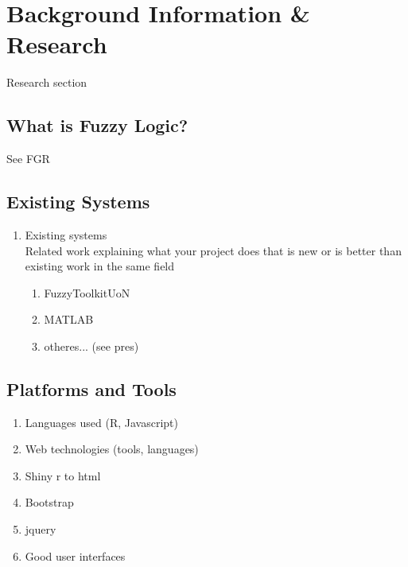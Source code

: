 \section{Background Information \& Research}

{\color{red}Research section}
\subsection{What is Fuzzy Logic?}
{\color{red}See FGR}

\subsection{Existing Systems}
\label{sec:existing-systems}

{\color{red}\begin{enumerate}
\item Existing systems\\
{\color{red} Related work explaining what your project does that is new or is better than existing work in the same field}
	\begin{enumerate}
		\item FuzzyToolkitUoN
		\item MATLAB
		\item otheres... (see pres)
	\end{enumerate}
\end{enumerate}
}

\subsection{Platforms and Tools}
{\color{red}\begin{enumerate}
\item Languages used (R, Javascript)
\item Web technologies (tools, languages)
\item Shiny r to html
\item Bootstrap
\item jquery
\item Good user interfaces
\end{enumerate}}

